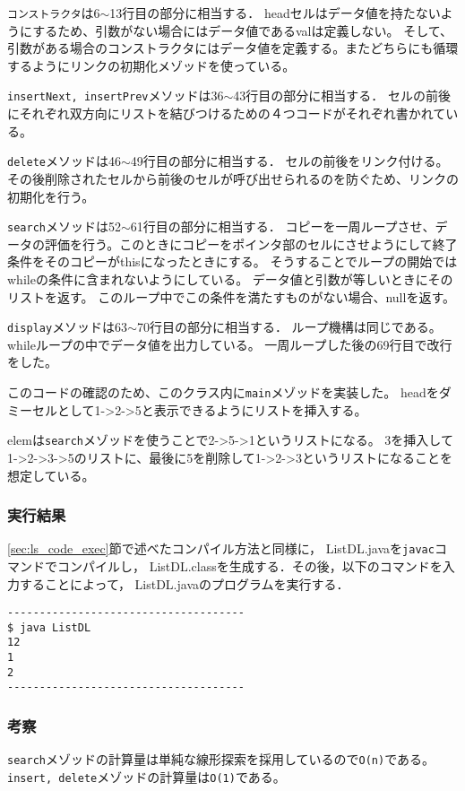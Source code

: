 \documentclass[10.5pt,a4paper]{jsarticle}
\newcommand{\secref}[1]{\ref{#1}節}
\begin{document}
\texttt{コンストラクタ}は6$\sim$13行目の部分に相当する．
headセルはデータ値を持たないようにするため、引数がない場合にはデータ値であるvalは定義しない。
そして、引数がある場合のコンストラクタにはデータ値を定義する。またどちらにも循環するようにリンクの初期化メゾッドを使っている。

\texttt{insertNext, insertPrev}メソッドは36$\sim$43行目の部分に相当する．
セルの前後にそれぞれ双方向にリストを結びつけるための４つコードがそれぞれ書かれている。

\texttt{delete}メソッドは46$\sim$49行目の部分に相当する．
セルの前後をリンク付ける。その後削除されたセルから前後のセルが呼び出せられるのを防ぐため、リンクの初期化を行う。

\texttt{search}メソッドは52$\sim$61行目の部分に相当する．
コピーを一周ループさせ、データの評価を行う。このときにコピーをポインタ部のセルにさせようにして終了条件をそのコピーがthisになったときにする。
そうすることでループの開始ではwhileの条件に含まれないようにしている。
データ値と引数が等しいときにそのリストを返す。
このループ中でこの条件を満たすものがない場合、nullを返す。

\texttt{display}メソッドは63$\sim$70行目の部分に相当する．
ループ機構は同じである。whileループの中でデータ値を出力している。
一周ループした後の69行目で改行をした。

このコードの確認のため、このクラス内に\texttt{main}メゾッドを実装した。
headをダミーセルとして1->2->5と表示できるようにリストを挿入する。

elemは\texttt{search}メゾッドを使うことで2->5->1というリストになる。
3を挿入して1->2->3->5のリストに、最後に5を削除して1->2->3というリストになることを想定している。

\subsubsection{実行結果}

\secref{sec:ls_code_exec}で述べたコンパイル方法と同様に，
ListDL.javaを\texttt{javac}コマンドでコンパイルし，
ListDL.classを生成する．その後，以下のコマンドを入力することによって，
ListDL.javaのプログラムを実行する．

\begin{verbatim}
-------------------------------------
$ java ListDL
12
1
2
-------------------------------------
\end{verbatim}
\subsubsection{考察}
\texttt{search}メゾッドの計算量は単純な線形探索を採用しているので\texttt{O(n)}である。
\texttt{insert, delete}メゾッドの計算量は\texttt{O(1)}である。
\end{document}
